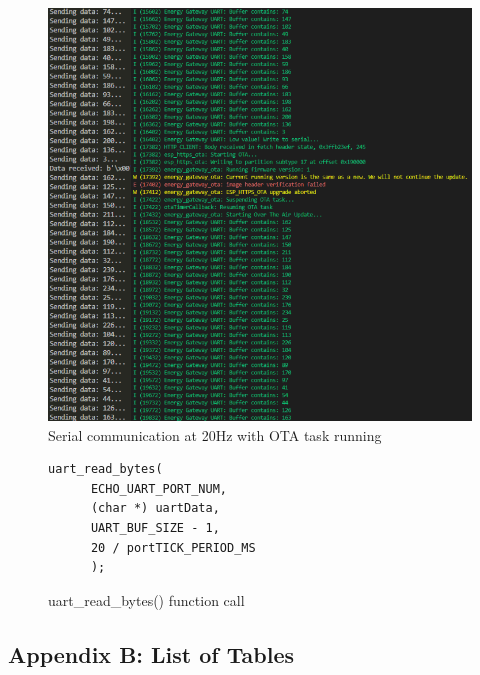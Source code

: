 \begin{figure}[h!]
  \centering
  \includegraphics[width=0.8\linewidth]{figures/send_receive_20Hz.png}
  \caption{Serial communication at 20Hz with OTA task running}
  \label{fig:serial_communication_20hz}
\end{figure}

\begin{figure}[h!]
  \centering
  \begin{lstlisting}[style=CStyle]
    uart_read_bytes(
      ECHO_UART_PORT_NUM, 
      (char *) uartData, 
      UART_BUF_SIZE - 1, 
      20 / portTICK_PERIOD_MS 
      );
  \end{lstlisting}
  \caption{uart\_read\_bytes() function call}
  \label{fig:uart_read_bytes_function}
\end{figure}

\clearpage

\subsection{Appendix B: List of Tables}
\label{sec:appendixB}

